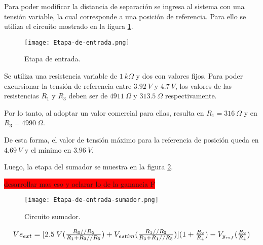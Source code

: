 \noindent Para poder modificar la distancia de separación se ingresa al sistema con una tensión variable, la cual corresponde a una posición de referencia. Para ello se utiliza el circuito mostrado en la figura \ref{fig:etapa-de-entrada}.

\begin{figure}[H]
	\centering
	\texttt{[image: Etapa-de-entrada.png]}
	\caption{ Etapa de entrada.}
	\label{fig:etapa-de-entrada}
\end{figure}

 
Se utiliza una resistencia variable de $1\:k\Omega$ y dos con valores fijos. Para poder excursionar la tensión de referencia entre $3.92\:V$ y $4.7\:V$, los valores de las resistencias $R_1$ y $R_3$ deben ser de $4911\:\Omega$ y $313.5\:\Omega$ respectivamente. 

Por lo tanto, al adoptar un valor comercial para ellas, resulta en $R_1 = 316 \:\Omega$ y en $R_3 = 4990 \:\Omega$.

De esta forma, el valor de tensión máximo para la referencia de posición queda en $4.69\:V$ y el mínimo en $3.96\:V$.
 
Luego, la etapa del sumador se muestra en la figura \ref{fig:etapa-de-entrada-sumador}.

\colorbox{red}{desarrollar mas eso y aclarar lo de la ganancia F}

\begin{figure}[H]
	\centering
	\texttt{[image: Etapa-de-entrada-sumador.png]}
	\caption{Circuito sumador.}
	\label{fig:etapa-de-entrada-sumador}
\end{figure}


\begin{equation*}
	\resizebox{.99\hsize}{!}
	{
		$
		Ve_{ext}= [2.5\:V (\frac{R_3//R_5}{R_1+R_3//R_5})+V_{estim}(\frac{R_1//R_5}{R_3+R_1//R_5})](1+\frac{R_2}{R_4})-V_{y_{ref}}(\frac{R_2}{R_4})
		$
	}
\end{equation*}







